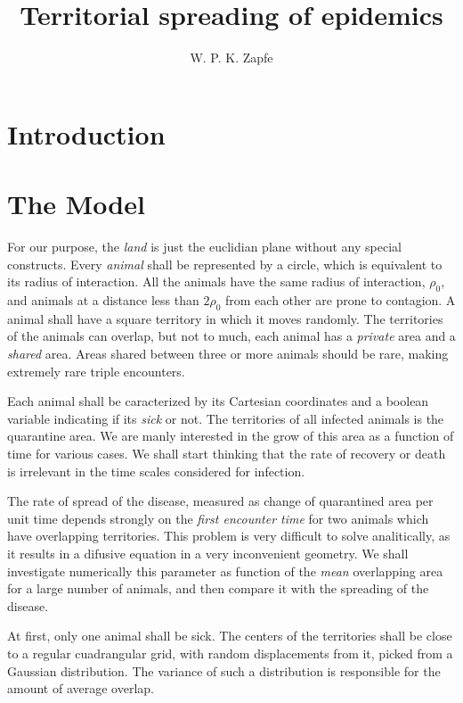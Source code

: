 \documentclass[letterpaperr,12pt]{article}
\title{Territorial spreading of epidemics}
\author{W. P. K. Zapfe}
\begin{document}
\maketitle

\begin{abstract}


\end{abstract}


\section{Introduction}


\section{The Model}

For our purpose, the \emph{land} is just the euclidian plane without any
special constructs. Every \emph{animal} shall be represented by a circle,
which is equivalent to its radius of interaction. All the animals
have the same radius of interaction, $\rho_0$, and animals at a distance
less than $2 \rho_0$ from each other are prone to contagion. A animal shall have
a square territory in which it moves randomly. The territories of the animals
can overlap, but not to much, each animal has a \emph{private} area and 
a \emph{shared} area. Areas shared between three or more animals should be rare,
making extremely rare triple encounters.  

Each animal shall be caracterized by its Cartesian coordinates and a boolean
variable indicating if its \emph{sick} or not. The territories of all infected
animals is the quarantine area. We are manly interested in the grow of
this area as a function of time for various cases. We shall start
thinking that the rate of recovery or death is irrelevant in the time scales
considered for infection.
 
The rate of spread of the disease, measured as change of quarantined area
per unit time depends strongly on the \emph{first encounter time} for
two animals which have overlapping territories. This problem is very
difficult to solve analitically, as it results in a difusive equation
in a very inconvenient geometry. We shall investigate numerically
this parameter as function of the \emph{mean} overlapping area for a large
number of animals, and then compare it with the spreading of the disease.

At first, only one animal shall be sick. The centers of the territories
shall be close to a regular cuadrangular grid, with random displacements
from it, picked from a Gaussian distribution. The variance of such a
distribution is responsible for the amount of average overlap. 
\end{document}
